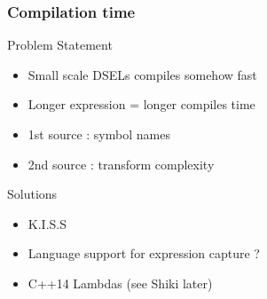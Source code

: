 \begin{frame}
\frametitle{Compilation time}
\begin{block}{Problem Statement}
\begin{itemize}
\item Small scale DSELs compiles somehow fast
\item Longer expression = longer compiles time
\item 1st source : symbol names
\item 2nd source : transform complexity
\end{itemize}
\end{block}{}

\begin{block}{Solutions}
\begin{itemize}
\item K.I.S.S
\item Language support for expression capture ?
\item C++14 Lambdas (see Shiki later)
\end{itemize}
\end{block}{}
\end{frame}

